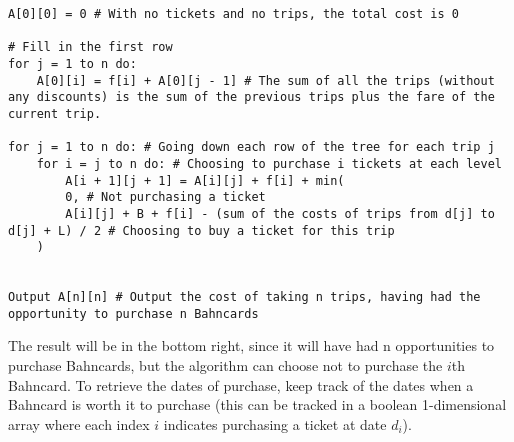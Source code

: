 \documentclass[letterpaper,notitlepage,twoside]{article}
\begin{document}
\begin{verbatim} 
A[0][0] = 0 # With no tickets and no trips, the total cost is 0

# Fill in the first row
for j = 1 to n do:
    A[0][i] = f[i] + A[0][j - 1] # The sum of all the trips (without any discounts) is the sum of the previous trips plus the fare of the current trip.
    
for j = 1 to n do: # Going down each row of the tree for each trip j
    for i = j to n do: # Choosing to purchase i tickets at each level
        A[i + 1][j + 1] = A[i][j] + f[i] + min(
	    0, # Not purchasing a ticket
	    A[i][j] + B + f[i] - (sum of the costs of trips from d[j] to d[j] + L) / 2 # Choosing to buy a ticket for this trip
	)


Output A[n][n] # Output the cost of taking n trips, having had the opportunity to purchase n Bahncards
\end{verbatim}

The result will be in the bottom right, since it will have had n opportunities to purchase Bahncards, but the algorithm can choose not to purchase the $i$th Bahncard. To retrieve the dates of purchase, keep track of the dates when a Bahncard is worth it to purchase (this can be tracked in a boolean 1-dimensional array where each index $i$ indicates purchasing a ticket at date $d_i$).
\end{document}
